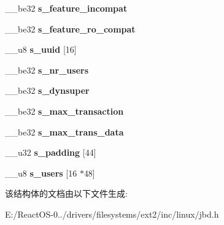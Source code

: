 \begin{DoxyCompactItemize}
\item 
\mbox{\label{structjournal__superblock__s_a3d87ac1d9bcb596ddb1f58ea303b7126}} 
\+\_\+\+\_\+be32 {\bfseries s\+\_\+feature\+\_\+incompat}
\item 
\mbox{\label{structjournal__superblock__s_aa3456370f8ddc1e208bf2deb7c7a7732}} 
\+\_\+\+\_\+be32 {\bfseries s\+\_\+feature\+\_\+ro\+\_\+compat}
\item 
\mbox{\label{structjournal__superblock__s_adfb61017055228f5a1c5542ce1f4633d}} 
\+\_\+\+\_\+u8 {\bfseries s\+\_\+uuid} \mbox{[}16\mbox{]}
\item 
\mbox{\label{structjournal__superblock__s_a09cdc078dd5bd70e1716805c94569144}} 
\+\_\+\+\_\+be32 {\bfseries s\+\_\+nr\+\_\+users}
\item 
\mbox{\label{structjournal__superblock__s_a6371832ac666fb72afd4828ecec58c24}} 
\+\_\+\+\_\+be32 {\bfseries s\+\_\+dynsuper}
\item 
\mbox{\label{structjournal__superblock__s_a36438e894af7f91e94dc95414727211a}} 
\+\_\+\+\_\+be32 {\bfseries s\+\_\+max\+\_\+transaction}
\item 
\mbox{\label{structjournal__superblock__s_a6584fb1e8fa7356ca22b7c6a680acac2}} 
\+\_\+\+\_\+be32 {\bfseries s\+\_\+max\+\_\+trans\+\_\+data}
\item 
\mbox{\label{structjournal__superblock__s_ac364c31fb947ff50c234162d3384b3c4}} 
\+\_\+\+\_\+u32 {\bfseries s\+\_\+padding} \mbox{[}44\mbox{]}
\item 
\mbox{\label{structjournal__superblock__s_aadf25a8fd8abfbefe89cb098135538a5}} 
\+\_\+\+\_\+u8 {\bfseries s\+\_\+users} \mbox{[}16 $\ast$48\mbox{]}
\end{DoxyCompactItemize}


该结构体的文档由以下文件生成\+:\begin{DoxyCompactItemize}
\item 
E\+:/\+React\+O\+S-\/0../drivers/filesystems/ext2/inc/linux/jbd.\+h\end{DoxyCompactItemize}
